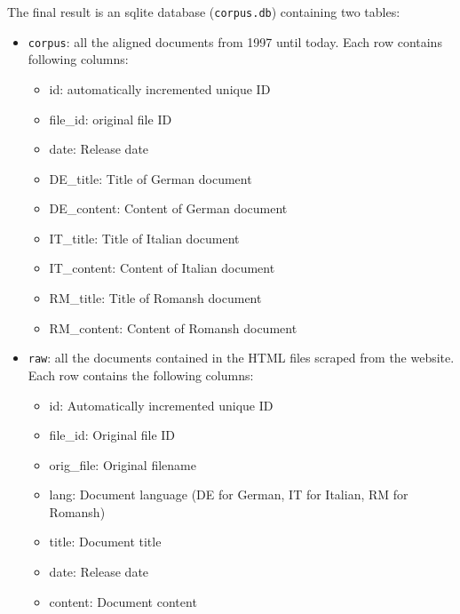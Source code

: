 The final result is an sqlite database (\texttt{corpus.db}) containing two tables:
\begin{itemize}
	\item \texttt{corpus}: all the aligned documents from 1997 until today. 
	Each row contains following columns:
	\begin{itemize}
		\item id: automatically incremented unique ID
		\item file\_id: original file ID
		\item date: Release date
		\item DE\_title: Title of German document
		\item DE\_content: Content of German document
		\item IT\_title: Title of Italian document
		\item IT\_content: Content of Italian document
		\item RM\_title: Title of Romansh document
		\item RM\_content: Content of Romansh document
	\end{itemize}
	\item \texttt{raw}: all the documents contained in the HTML files scraped from the website. 
	Each row contains the following columns:
	\begin{itemize}
		\item id: Automatically incremented unique ID
		\item file\_id: Original file ID
		\item orig\_file: Original filename
		\item lang: Document language (DE for German, IT for Italian, RM for Romansh)
		\item title: Document title
		\item date: Release date
		\item content: Document content
	\end{itemize}
\end{itemize}



